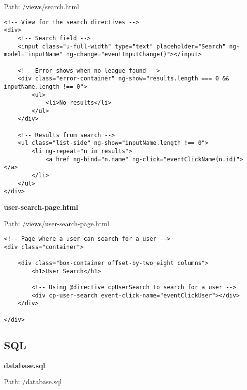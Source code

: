 Path: /views/search.html

{\scriptsize
\begin{lstlisting}
<!-- View for the search directives -->
<div>
	<!-- Search field -->
	<input class="u-full-width" type="text" placeholder="Search" ng-model="inputName" ng-change="eventInputChange()"></input>

	<!-- Error shows when no league found -->
	<div class="error-container" ng-show="results.length === 0 && inputName.length !== 0">
		<ul>
			<li>No results</li>
		</ul>
	</div>

	<!-- Results from search -->
	<ul class="list-side" ng-show="inputName.length !== 0">
		<li ng-repeat="n in results">
			<a href ng-bind="n.name" ng-click="eventClickName(n.id)"></a>
		</li>
	</ul>
</div>\end{lstlisting}
}
\textbf{user-search-page.html}\label{user-search-page.html}

Path: /views/user-search-page.html

{\scriptsize
\begin{lstlisting}
<!-- Page where a user can search for a user -->
<div class="container">

	<div class="box-container offset-by-two eight columns">
		<h1>User Search</h1>

		<!-- Using @directive cpUserSearch to search for a user -->
		<div cp-user-search event-click-name="eventClickUser"></div>
	</div>

</div>\end{lstlisting}
}
\newpage
\subsection{SQL}\label{SQL}
\textbf{database.sql}\label{database.sql}

Path: /database.sql

